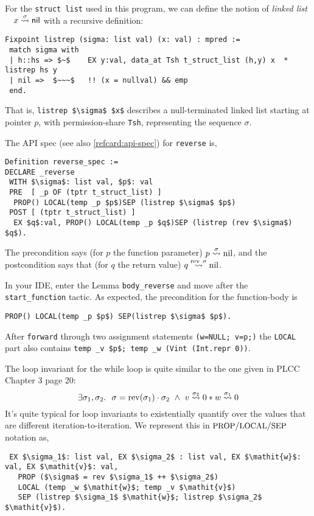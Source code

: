 \documentclass[12pt,fleqn,openany,oneside,showtrims]{memoir}
\begin{document}
For the \lstinline{struct list} used in this program,
we can define the notion of \emph{linked list}
~~$\listrep{\sigma}{x}{\mathsf{nil}}$
with a recursive definition:

\begin{lstlisting}
Fixpoint listrep (sigma: list val) (x: val) : mpred :=
 match sigma with
 | h::hs => $~$    EX y:val, data_at Tsh t_struct_list (h,y) x  * listrep hs y
 | nil =>  $~~~$   !! (x = nullval) && emp
 end.
\end{lstlisting}

That is, \lstinline{listrep $\sigma$ $x$}
describes a null-terminated linked list starting at pointer $p$,
with permission-share \lstinline{Tsh},
representing the sequence $\sigma$.

The API spec (see also \autoref{refcard:api-spec}) for \lstinline{reverse} is,
\begin{lstlisting}
Definition reverse_spec :=
DECLARE _reverse
 WITH $\sigma$: list val, $p$: val
 PRE  [ _p OF (tptr t_struct_list) ]
  PROP() LOCAL(temp _p $p$)SEP (listrep $\sigma$ $p$)
 POST [ (tptr t_struct_list) ]
  EX $q$:val, PROP() LOCAL(temp _p $q$)SEP (listrep (rev $\sigma$) $q$).
\end{lstlisting}
\vspace{-2ex}
The precondition says
(for $p$ the function parameter)
$\listrep{\sigma}{p}{\mathrm{nil}}$,
and the postcondition says
that (for $q$ the return value)
$\listrep{\mathrm{rev}~\sigma}{q}{\mathrm{nil}}$.

In your IDE, enter the Lemma \lstinline{body_reverse} and
move after the \lstinline{start_function} tactic.
As expected, the precondition for the function-body is
\begin{lstlisting}
PROP() LOCAL(temp _p $p$) SEP(listrep $\sigma$ $p$).
\end{lstlisting}
After \lstinline{forward} through two assignment statements
\lstinline{(w=NULL; v=p;)}
the \lstinline{LOCAL} part also contains
\lstinline{temp _v $p$; temp _w (Vint (Int.repr 0))}.

The loop invariant for the while loop is quite similar to the
one given in PLCC Chapter 3 page 20:
\[\exists \sigma_1,\sigma_2.
~~\sigma=\mathrm{rev}(\sigma_1)\cdot\sigma_2
~\wedge~
\listrep{\sigma_2}{v}{0}
*
\listrep{\sigma_1}{w}{0}
\]
It's
quite typical for loop invariants to existentially quantify
over the values that are different iteration-to-iteration.
We represent this in $\PROP/\LOCAL/\SEP$ notation as,
\begin{lstlisting}
 EX $\sigma_1$: list val, EX $\sigma_2$ : list val, EX $\mathit{w}$: val, EX $\mathit{v}$: val,
   PROP ($\sigma$ = rev $\sigma_1$ ++ $\sigma_2$)
   LOCAL (temp _w $\mathit{w}$; temp _v $\mathit{v}$)
   SEP (listrep $\sigma_1$ $\mathit{w}$; listrep $\sigma_2$ $\mathit{v}$).
\end{lstlisting}
\end{document}
